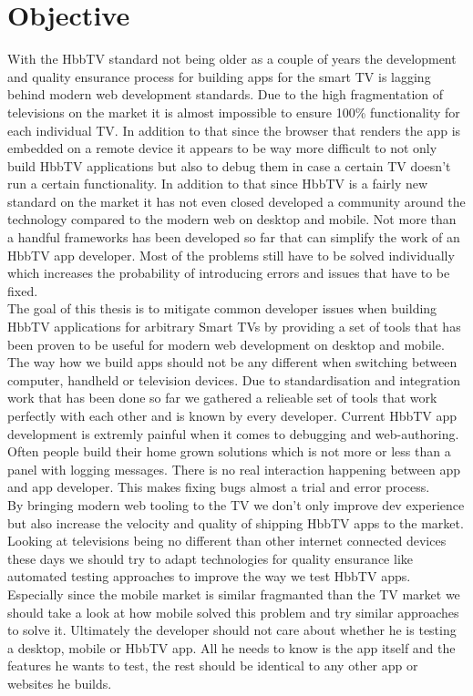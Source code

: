 \section{Objective\label{sec:objective}}

With the HbbTV standard not being older as a couple of years the development and quality ensurance process for
building apps for the smart TV is lagging behind modern web development standards. Due to the high fragmentation
of televisions on the market it is almost impossible to ensure 100\% functionality for each individual TV.
In addition to that since the browser that renders the app is embedded on a remote device it appears to be
way more difficult to not only build HbbTV applications but also to debug them in case a certain TV doesn't
run a certain functionality. In addition to that since HbbTV is a fairly new standard on the market it has not
even closed developed a community around the technology compared to the modern web on desktop and mobile. Not
more than a handful frameworks has been developed so far that can simplify the work of an HbbTV app developer. Most
of the problems still have to be solved individually which increases the probability of introducing errors and
issues that have to be fixed.\\
The goal of this thesis is to mitigate common developer issues when building HbbTV applications for arbitrary
Smart TVs by providing a set of tools that has been proven to be useful for modern web development on desktop
and mobile. The way how we build apps should not be any different when switching between computer, handheld or
television devices. Due to standardisation and integration work that has been done so far we gathered a relieable
set of tools that work perfectly with each other and is known by every developer. Current HbbTV app development
is extremly painful when it comes to debugging and web-authoring. Often people build their home grown solutions
which is not more or less than a panel with logging messages. There is no real interaction happening between app
and app developer. This makes fixing bugs almost a trial and error process.\\
By bringing modern web tooling to the TV we don't only improve dev experience but also increase the velocity
and quality of shipping HbbTV apps to the market. Looking at televisions being no different than other internet
connected devices these days we should try to adapt technologies for quality ensurance like automated testing
approaches to improve the way we test HbbTV apps. Especially since the mobile market is similar fragmanted
than the TV market we should take a look at how mobile solved this problem and try similar approaches to solve
it. Ultimately the developer should not care about whether he is testing a desktop, mobile or HbbTV app. All
he needs to know is the app itself and the features he wants to test, the rest should be identical to any other
app or websites he builds.

